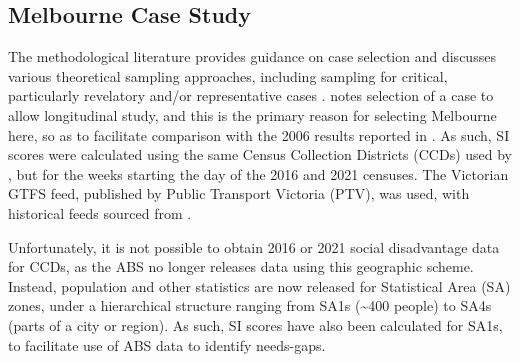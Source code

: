 \documentclass[preprint, 3p,
authoryear]{elsarticle} %
\begin{document}
\subsection{Melbourne Case Study}\label{melbourne-case-study}

The methodological literature provides guidance on case selection and
discusses various theoretical sampling approaches, including sampling
for critical, particularly revelatory and/or representative cases
\citep{Eisenhardt1989aa, Yin2009aa, Denscombe2007aa, Eisenhardt2007TBfC}.
\citet{Yin2009aa} notes selection of a case to allow longitudinal study,
and this is the primary reason for selecting Melbourne here, so as to
facilitate comparison with the 2006 results reported in
\citet{currie2010identifying}. As such, SI scores were calculated using
the same Census Collection Districts (CCDs) used by
\citet{currie2010identifying}, but for the weeks starting the day of the
2016 and 2021 censuses. The Victorian GTFS feed, published by Public
Transport Victoria (PTV), was used, with historical feeds sourced from
\citet{transitfeeds_victoria:2023aa}.

Unfortunately, it is not possible to obtain 2016 or 2021 social
disadvantage data for CCDs, as the ABS no longer releases data using
this geographic scheme. Instead, population and other statistics are now
released for Statistical Area (SA) zones, under a hierarchical structure
ranging from SA1s (\textasciitilde400 people) to SA4s (parts of a city
or region)\citep{ABSmaps}. As such, SI scores have also been calculated
for SA1s, to facilitate use of ABS data to identify needs-gaps.
\end{document}
